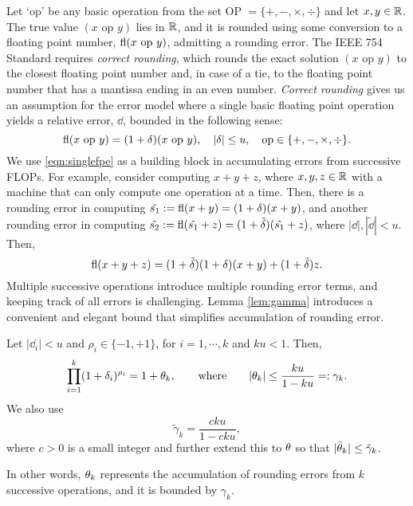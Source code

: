 Let `op' be any basic operation from the set OP $=\{+, -, \times, \div\}$ and let $x,y\in \mathbb{R}$.
The true value $(x\text{ op }y)$ lies in $\mathbb{R}$, and it is rounded using some conversion to a floating point number, $\mathrm{fl}(x\text{ op }y)$, admitting a rounding error. 
The IEEE 754 Standard requires \emph{correct rounding}, which rounds the exact solution $(x\text{ op }y)$ to the closest floating point number and, in case of a tie, to the floating point number that has a mantissa ending in an even number.
\emph{Correct rounding} gives us an assumption for the error model where a single basic floating point operation yields a relative error, $\dd$, bounded in the following sense:
\begin{equation}
\fl(x\text{ op }y) = (1 + \dd)(x\text{ op }y),\quad |\dd|\leq u, \quad \text{op}\in\{+, -, \times, \div\}. \label{eqn:singlefpe}
\end{equation}
We use \cref{eqn:singlefpe} as a building block in accumulating errors from successive FLOPs.
For example, consider computing $x+y+z$, where $x,y,z\in\mathbb{R}$ with a machine that can only compute one operation at a time.
Then, there is a rounding error in computing $\hat{s_1}:= \mathrm{fl}(x+y) = (1+\delta)(x+y)$, and another rounding error in computing $\hat{s_2}:= \mathrm{fl}(\hat{s_1}+ z) = (1+\tilde{\delta})(\hat{s_1}+z)$, where $|\dd|,|\tilde{\dd}|<u$.
Then, 
\begin{equation}
\fl(x+y+z) = (1+\tilde{\dd})(1+\dd) (x+y) + (1+\tilde{\dd}) z.\label{eqn:FPbasic3}
\end{equation}
Multiple successive operations introduce multiple rounding error terms, and keeping track of all errors is challenging.
Lemma \ref{lem:gamma} introduces a convenient and elegant bound that simplifies accumulation of rounding error. 
\begin{lemma}
	\label{lem:gamma}
	Let $|\dd_i|<u$ and $\rho_i \in\{-1, +1\}$, for $i = 1 , \cdots, k$ and $ku < 1$. Then, 
	\begin{equation}
	\prod_{i=1}^k (1+\delta_i)^{\rho_i} = 1 + \theta_{k},
	\qquad \mbox{where} \qquad
	|\theta_{k}|\leq \frac{ku}{1-ku}=:\gamma_{k}.
	\end{equation}
	We also use 
	\begin{equation*}
	\tilde{\gamma}_{k} = \frac{cku}{1-cku},
	\end{equation*}
	where $c>0$ is a small integer and further extend this to $\theta$ so that $|\tilde{\theta}_k| \leq \tilde{\gamma}_k$.
\end{lemma}
In other words, $\theta_{k}$ represents the accumulation of rounding errors from $k$ successive operations, and it is bounded by $\gamma_{k}$. 
